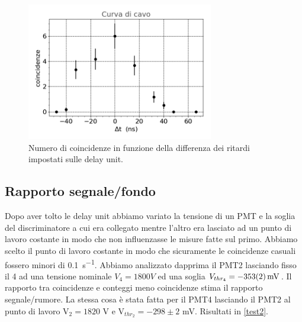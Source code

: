\documentclass[a4paper]{article}
\begin{document}
\begin{figure}[h]
\centering
\includegraphics[width=22em]{curva_cavo}
\caption{Numero di coincidenze in funzione della differenza dei ritardi impostati sulle delay unit.}
\label{curv}
\end{figure}



\subsection*{Rapporto segnale/fondo}

Dopo aver tolto le delay unit abbiamo variato la tensione di un PMT  e la soglia del discriminatore a cui era collegato mentre l'altro era lasciato ad un punto di lavoro costante in modo che non influenzasse le misure fatte sul primo.
Abbiamo scelto il punto di lavoro costante in modo che sicuramente le coincidenze casuali fossero minori di \SI{0.1}{s^{-1}}.
Abbiamo analizzato dapprima il PMT2 lasciando fisso il 4 ad una tensione nominale $V_4=\SI{1800} V$ ed una soglia $V_{thr_4}=\SI{-353\pm2}{mV}$. 
Il rapporto tra coincidenze e conteggi meno coincidenze stima il rapporto segnale/rumore.
La stessa cosa è stata fatta per il PMT4 lasciando il PMT2 al punto di lavoro V$_2=1820$\! V e V$_{thr_2}=-298\pm2$\! mV.
Risultati in \autoref{test2}.
\end{document}
